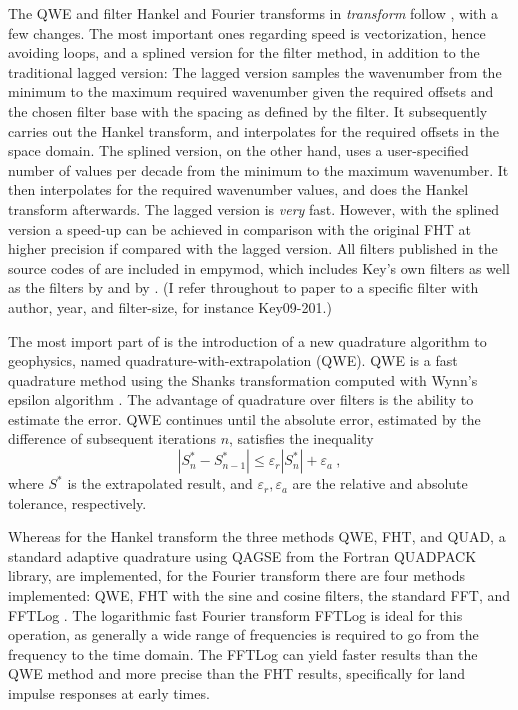 \documentclass[manuscript,revised]{geophysics}
\begin{document}
The QWE and filter Hankel and Fourier transforms in \emph{transform} follow
\cite{GEO.12.Key}, with a few changes. The most important ones regarding speed
is vectorization, hence avoiding loops, and a splined version for the filter
method, in addition to the traditional lagged version: The lagged version
samples the wavenumber from the minimum to the maximum required wavenumber
given the required offsets and the chosen filter base with the spacing as
defined by the filter. It subsequently carries out the Hankel transform, and
interpolates for the required offsets in the space domain. The splined version,
on the other hand, uses a user-specified number of values per decade from the
minimum to the maximum wavenumber. It then interpolates for the required
wavenumber values, and does the Hankel transform afterwards. The lagged version
is \emph{very} fast. However, with the splined version a speed-up can be
achieved in comparison with the original FHT at higher precision if compared
with the lagged version. All filters published in the source codes of
\cite{GEO.09.Key, GEO.12.Key} are included in empymod, which includes Key's own
filters as well as the filters by \cite{TMS.82.Anderson} and by
\cite{GP.07.Kong}. (I refer throughout to paper to a specific filter with
author, year, and filter-size, for instance Key09-201.)

The most import part of \cite{GEO.12.Key} is the introduction of a new
quadrature algorithm to geophysics, named
qua\-dra\-ture-with-ex\-tra\-po\-la\-tion (QWE). QWE is a fast quadrature
method using the Shanks transformation \citep{JMP.55.Shanks} computed with
Wynn's epsilon algorithm \citep{MC.56.Wynn}. The advantage of quadrature over
filters is the ability to estimate the error. QWE continues until the absolute
error, estimated by the difference of subsequent iterations $n$, satisfies the
inequality
%
\begin{equation}
  |S^*_n-S^*_{n-1}| \le \varepsilon_r|S^*_n| + \varepsilon_a\ ,
  \label{eq:err}
\end{equation}
%
where $S^*$ is the extrapolated result, and $\varepsilon_r, \varepsilon_a$ are
the relative and absolute tolerance, respectively.

Whereas for the Hankel transform the three methods QWE, FHT, and QUAD, a
standard adaptive quadrature using QAGSE from the Fortran QUADPACK library, are
implemented, for the Fourier transform there are four methods implemented: QWE,
FHT with the sine and cosine filters, the standard FFT, and FFTLog
\citep{RAS.00.Hamilton}. The logarithmic fast Fourier transform FFTLog is
ideal for this operation, as generally a wide range of frequencies is required
to go from the frequency to the time domain. The FFTLog can yield faster
results than the QWE method and more precise than the FHT results, specifically
for land impulse responses at early times.
\end{document}
